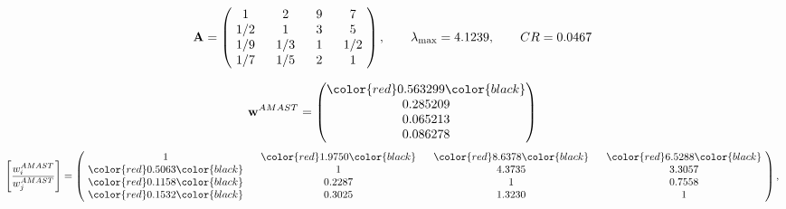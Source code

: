 \begin{example}
\begin{equation*}
\mathbf{A} =
\begin{pmatrix}
$\,\,$ 1 $\,\,$ & $\,\,$2$\,\,$ & $\,\,$9$\,\,$ & $\,\,$7 $\,\,$ \\
$\,\,$ 1/2$\,\,$ & $\,\,$ 1 $\,\,$ & $\,\,$3$\,\,$ & $\,\,$5 $\,\,$ \\
$\,\,$ 1/9$\,\,$ & $\,\,$ 1/3$\,\,$ & $\,\,$ 1 $\,\,$ & $\,\,$ 1/2 $\,\,$ \\
$\,\,$ 1/7$\,\,$ & $\,\,$ 1/5$\,\,$ & $\,\,$2$\,\,$ & $\,\,$ 1  $\,\,$ \\
\end{pmatrix},
\qquad
\lambda_{\max} =
4.1239,
\qquad
CR = 0.0467
\end{equation*}

\begin{equation*}
\mathbf{w}^{AMAST} =
\begin{pmatrix}
\color{red} 0.563299\color{black} \\
0.285209\\
0.065213\\
0.086278
\end{pmatrix}\end{equation*}
\begin{equation*}
\left[ \frac{{w}^{AMAST}_i}{{w}^{AMAST}_j} \right] =
\begin{pmatrix}
$\,\,$ 1 $\,\,$ & $\,\,$\color{red} 1.9750\color{black} $\,\,$ & $\,\,$\color{red} 8.6378\color{black} $\,\,$ & $\,\,$\color{red} 6.5288\color{black} $\,\,$ \\
$\,\,$\color{red} 0.5063\color{black} $\,\,$ & $\,\,$ 1 $\,\,$ & $\,\,$4.3735$\,\,$ & $\,\,$3.3057  $\,\,$ \\
$\,\,$\color{red} 0.1158\color{black} $\,\,$ & $\,\,$0.2287$\,\,$ & $\,\,$ 1 $\,\,$ & $\,\,$0.7558 $\,\,$ \\
$\,\,$\color{red} 0.1532\color{black} $\,\,$ & $\,\,$0.3025$\,\,$ & $\,\,$1.3230$\,\,$ & $\,\,$ 1  $\,\,$ \\
\end{pmatrix},
\end{equation*}


\end{example}
